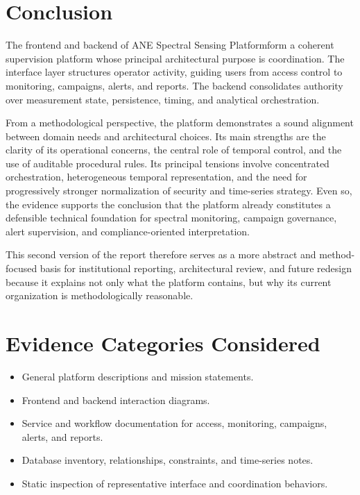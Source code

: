 \documentclass[11pt,a4paper]{article}
\newcommand{\project}{ANE Spectral Sensing Platform}
\begin{document}
\section{Conclusion}
The frontend and backend of \project form a coherent supervision platform whose principal architectural purpose is coordination. The interface layer structures operator activity, guiding users from access control to monitoring, campaigns, alerts, and reports. The backend consolidates authority over measurement state, persistence, timing, and analytical orchestration.

From a methodological perspective, the platform demonstrates a sound alignment between domain needs and architectural choices. Its main strengths are the clarity of its operational concerns, the central role of temporal control, and the use of auditable procedural rules. Its principal tensions involve concentrated orchestration, heterogeneous temporal representation, and the need for progressively stronger normalization of security and time-series strategy. Even so, the evidence supports the conclusion that the platform already constitutes a defensible technical foundation for spectral monitoring, campaign governance, alert supervision, and compliance-oriented interpretation.

This second version of the report therefore serves as a more abstract and method-focused basis for institutional reporting, architectural review, and future redesign because it explains not only what the platform contains, but why its current organization is methodologically reasonable.

\appendix

\section{Evidence Categories Considered}
\begin{itemize}
  \item General platform descriptions and mission statements.
  \item Frontend and backend interaction diagrams.
  \item Service and workflow documentation for access, monitoring, campaigns, alerts, and reports.
  \item Database inventory, relationships, constraints, and time-series notes.
  \item Static inspection of representative interface and coordination behaviors.
\end{itemize}
\end{document}
